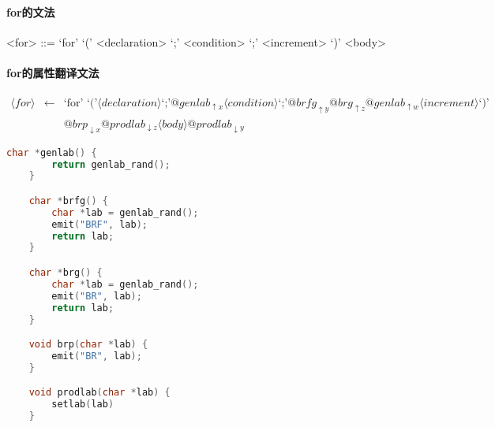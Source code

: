 \documentclass[UTF8]{ctexart}
\begin{document}
\paragraph*{for的文法}

\begin{grammar}

    <for> ::= `for' `(' <declaration> `;' <condition> `;' <increment> `)' <body>

\end{grammar}

\paragraph*{for的属性翻译文法}

\begin{align*}
    \langle for \rangle &\gets 
    &\text{`for' `('} \langle declaration \rangle \text{`;'}
    @genlab_{\uparrow x} \langle condition \rangle \text{`;'}
    @brfg_{\uparrow y} @brg_{\uparrow z} @genlab_{\uparrow w} \langle increment \rangle \text{`)'} \\
    &&@brp_{\downarrow x}@prodlab_{\downarrow z} \langle body \rangle 
    @prodlab_{\downarrow y}
\end{align*}

\begin{lstlisting}[language=C]
    char *genlab() {
        return genlab_rand();
    }

    char *brfg() {
        char *lab = genlab_rand();
        emit("BRF", lab);
        return lab;
    }

    char *brg() {
        char *lab = genlab_rand();
        emit("BR", lab);
        return lab;
    }

    void brp(char *lab) {
        emit("BR", lab);
    }

    void prodlab(char *lab) {
        setlab(lab)
    }
\end{lstlisting}
\end{document}
